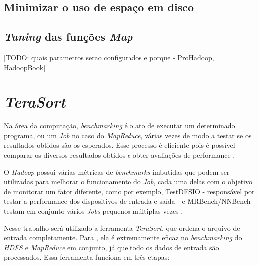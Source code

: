 \subsection{Minimizar o uso de espaço em disco}\label{ssec:minimizardisco}
\subsection{\textit{Tuning} das funções \textit{Map}}\label{ssec:tuningmapper}
[TODO: quais parametros serao configurados e porque - ProHadoop, HadoopBook]

\section{\textit{TeraSort}} \label{sec:terasort}

Na área da computação, \textit{benchmarking} é o ato de executar um determinado programa, ou um \textit{Job} no caso do \textit{MapReduce}, várias vezes de modo a testar se os resultados obtidos são os esperados. Esse processo é eficiente pois é possível comparar os diversos resultados obtidos e obter avaliações de performance \cite{HadoopBook15}.

O \textit{Hadoop} possui várias métricas de \textit{benchmarks} imbutidas que podem ser utilizadas para melhorar o funcionamento do \textit{Job}, cada uma delas com o objetivo de monitorar um fator diferente, como por exemplo, TestDFSIO  - responsável por testar a performance dos dispositivos de entrada e saída - e MRBench/NNBench - testam em conjunto vários \textit{Jobs} pequenos múltiplas vezes \cite{HadoopBook15}.

Nesse trabalho será utilizado a ferramenta \textit{TeraSort}, que ordena o arquivo de entrada completamente. Para \textcite{HadoopBook15}, ela é extremamente eficaz no \textit{benchmarking} do \textit{HDFS} e \textit{MapReduce} em conjunto, já que todo os dados de entrada são processados. Essa ferramenta funciona em três etapas:

